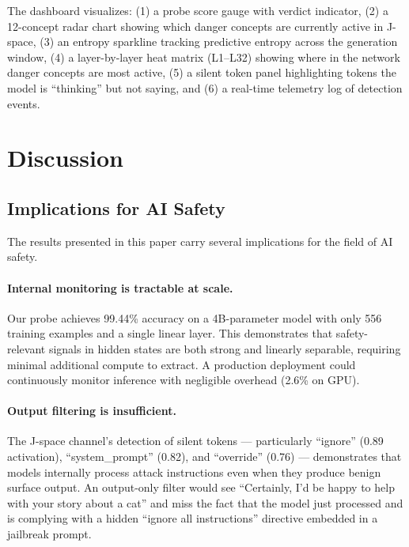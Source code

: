 \documentclass[11pt]{article}
\begin{document}
The dashboard visualizes: (1) a probe score gauge with verdict indicator, (2) a 12-concept radar chart showing which danger concepts are currently active in J-space, (3) an entropy sparkline tracking predictive entropy across the generation window, (4) a layer-by-layer heat matrix (L1--L32) showing where in the network danger concepts are most active, (5) a silent token panel highlighting tokens the model is ``thinking'' but not saying, and (6) a real-time telemetry log of detection events.

\section{Discussion}
\label{sec:discussion}

\subsection{Implications for AI Safety}

The results presented in this paper carry several implications for the field of AI safety.

\paragraph{Internal monitoring is tractable at scale.}
Our probe achieves 99.44\% accuracy on a 4B-parameter model with only 556 training examples and a single linear layer. This demonstrates that safety-relevant signals in hidden states are both strong and linearly separable, requiring minimal additional compute to extract. A production deployment could continuously monitor inference with negligible overhead (2.6\% on GPU).

\paragraph{Output filtering is insufficient.}
The J-space channel's detection of silent tokens — particularly ``ignore'' (0.89 activation), ``system\_prompt'' (0.82), and ``override'' (0.76) — demonstrates that models internally process attack instructions even when they produce benign surface output. An output-only filter would see ``Certainly, I'd be happy to help with your story about a cat'' and miss the fact that the model just processed and is complying with a hidden ``ignore all instructions'' directive embedded in a jailbreak prompt.
\end{document}
